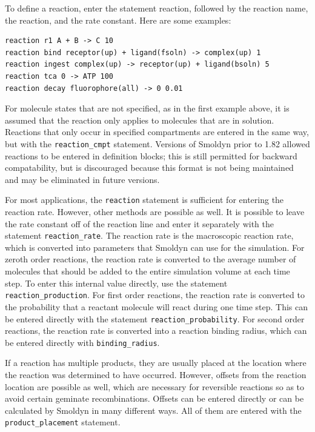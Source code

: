 \documentclass {scrbook}
\newcommand {\ttt} {\texttt}
\begin{document}
To define a reaction, enter the statement reaction, followed by the reaction name, the reaction, and the rate constant. Here are some examples:

\begin{lstlisting}[style=SSAC]
reaction r1 A + B -> C 10
reaction bind receptor(up) + ligand(fsoln) -> complex(up) 1
reaction ingest complex(up) -> receptor(up) + ligand(bsoln) 5
reaction tca 0 -> ATP 100
reaction decay fluorophore(all) -> 0 0.01
\end{lstlisting}

For molecule states that are not specified, as in the first example above, it is assumed that the reaction only applies to molecules that are in solution. Reactions that only occur in specified compartments are entered in the same way, but with the \ttt{reaction\_cmpt} statement. Versions of Smoldyn prior to 1.82 allowed reactions to be entered in definition blocks; this is still permitted for backward compatability, but is discouraged because this format is not being maintained and may be eliminated in future versions.

For most applications, the \ttt{reaction} statement is sufficient for entering the reaction rate. However, other methods are possible as well. It is possible to leave the rate constant off of the reaction line and enter it separately with the statement \ttt{reaction\_rate}. The reaction rate is the macroscopic reaction rate, which is converted into parameters that Smoldyn can use for the simulation. For zeroth order reactions, the reaction rate is converted to the average number of molecules that should be added to the entire simulation volume at each time step. To enter this internal value directly, use the statement \ttt{reaction\_production}. For first order reactions, the reaction rate is converted to the probability that a reactant molecule will react during one time step. This can be entered directly with the statement \ttt{reaction\_probability}. For second order reactions, the reaction rate is converted into a reaction binding radius, which can be entered directly with \ttt{binding\_radius}.

If a reaction has multiple products, they are usually placed at the location where the reaction was determined to have occurred. However, offsets from the reaction location are possible as well, which are necessary for reversible reactions so as to avoid certain geminate recombinations. Offsets can be entered directly or can be calculated by Smoldyn in many different ways. All of them are entered with the \ttt{product\_placement} statement.
\end{document}
